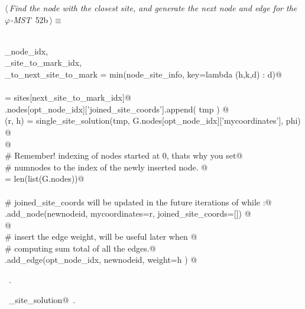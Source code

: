 \documentclass[11.5pt]{report}
\begin{document}
\needspace{3cm}
\vspace{-0.8cm} \newchunk
\begin{flushleft} \small
\begin{minipage}{\linewidth}\label{scrap77}\raggedright\small
{} $\langle\,${\itshape Find the node with the closest site, and generate the next node and edge for the $\varphi$-MST}\nobreak\ {\footnotesize {52b}}$\,\rangle\equiv$
\vspace{-1ex}
\begin{list}{}{} \item
\mbox{}\verb@@\\
\mbox{}\verb@opt_node_idx,          \@\\
\mbox{}\verb@next_site_to_mark_idx, \@\\
\mbox{}\verb@distance_to_next_site_to_mark = min(node_site_info, key=lambda (h,k,d) : d)@\\
\mbox{}\verb@@\\
\mbox{}\verb@tmp = sites[next_site_to_mark_idx]@\\
\mbox{}\verb@G.nodes[opt_node_idx]['joined_site_coords'].append(  tmp   ) @\\
\mbox{}\verb@(r, h) = single_site_solution(tmp, G.nodes[opt_node_idx]['mycoordinates'], phi) @\\
\mbox{}\verb@          @\\
\mbox{}\verb@# Remember! indexing of nodes started at 0, thats why you set@\\
\mbox{}\verb@# numnodes to the index of the newly inserted node. @\\
\mbox{}\verb@newnodeid = len(list(G.nodes))@\\
\mbox{}\verb@@\\
\mbox{}\verb@# joined_site_coords will be updated in the future iterations of while :@\\
\mbox{}\verb@G.add_node(newnodeid, mycoordinates=r, joined_site_coords=[]) @\\
\mbox{}\verb@  @\\
\mbox{}\verb@# insert the edge weight, will be useful later when @\\
\mbox{}\verb@# computing sum total of all the edges.@\\
\mbox{}\verb@G.add_edge(opt_node_idx, newnodeid, weight=h ) @\\
\mbox{}\verb@@{\NWsep}
\end{list}
\vspace{-1.5ex}
\footnotesize
\begin{list}{}{\setlength{\itemsep}{-\parsep}\setlength{\itemindent}{-\leftmargin}}
\item \NWtxtMacroRefIn\ .
\item \NWtxtIdentsUsed\nobreak\  \verb@single_site_solution@\nobreak\ .
\item{}
\end{list}
\end{minipage}\vspace{4ex}
\end{flushleft}
\end{document}
